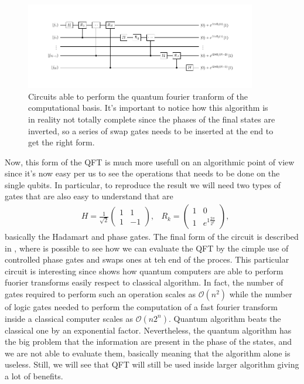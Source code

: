 \begin{figure}[t]
    \centering
    \includegraphics[width=0.9\textwidth]{Immagini/QFT.pdf}
    \caption
    {
        Circuits able to perform the quantum fourier tranform of the computational basis. It's important to notice how this algorithm is in reality not totally complete since the phases of the final states are inverted, so a series of swap gates needs to be inserted at the end to get the right form.
    }
    \label{fig:QFT}
\end{figure}
Now, this form of the QFT is much more usefull on an algorithmic point of view since it's now easy per us to see the operations that needs to be done on the single qubits. In particular, to reproduce the result we will need two types of gates that are also easy to understand that are
\begin{align}
    &H = \frac{1}{\sqrt{2}}\begin{pmatrix}
        1 & 1\\
        1 & -1
    \end{pmatrix},
    &R_k = \begin{pmatrix}
        1 & 0\\
        1 & e^{1\frac{2\pi}{2^k}}
    \end{pmatrix},
\end{align}
basically the Hadamart and phase gates. The final form of the circuit is described in , where is possible to see how we can evaluate the QFT by the cimple use of controlled phase gates and swaps ones at teh end of the proces. This particular circuit is interesting since shows how quantum computers are able to perform fuorier transforms easily respect to classical algorithm. In fact, the number of gates required to perform such an operation scales as $\mathcal{O}(n^2)$ while the number of logic gates needed to perform the computation of a fast fourier transform inside a classical computer scales as $\mathcal{O}(n2^n)$. Quantum algorithm beats the classical one by an exponential factor. Nevertheless, the quantum algorithm has the big problem that the information are present in the phase of the states, and we are not able to evaluate them, basically meaning that the algorithm alone is useless. Still, we will see that QFT will still be used inside larger algorithm giving a lot of benefits.

